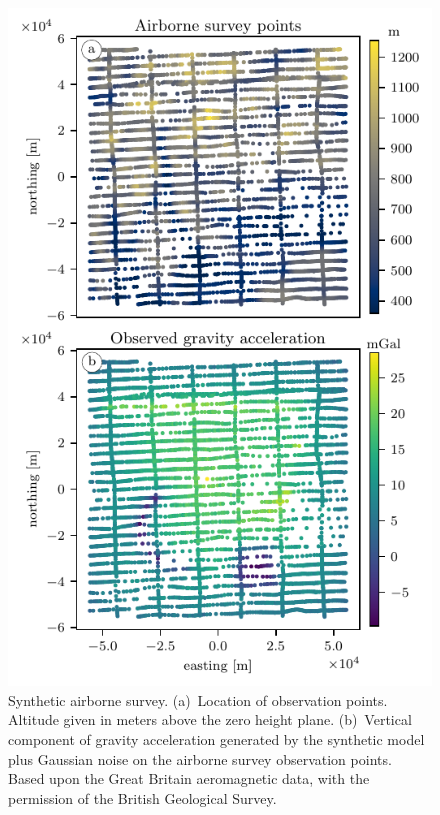\documentclass[twocolumn]{article}
\begin{document}
\begin{figure}
    \includegraphics[width=\linewidth]{figs/airborne-survey.pdf}
    \caption{
        Synthetic airborne survey.
        (a)~Location of observation points. Altitude given in meters above the
            zero height plane.
        (b)~Vertical component of gravity acceleration generated by the
            synthetic model plus Gaussian noise on the airborne survey
            observation points.
        Based upon the Great Britain aeromagnetic data, with the permission of
        the British Geological Survey.
    }
    \label{fig:synthetic-airborne-survey}
\end{figure}
\end{document}
